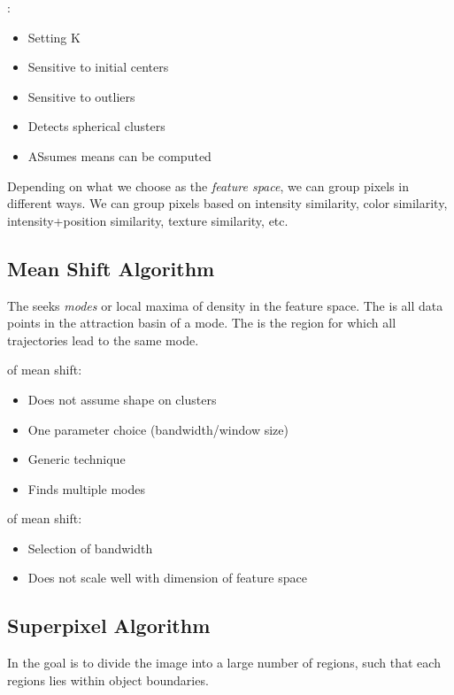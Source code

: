 \documentclass{article}
\begin{document}
:
\begin{itemize}
  \item Setting K 
  \item Sensitive to initial centers 
  \item Sensitive to outliers 
  \item Detects spherical clusters 
  \item ASsumes means can be computed 
\end{itemize}

Depending on what we choose as the \emph{feature space}, we can group pixels in different ways. We can group pixels based on intensity similarity, color similarity, intensity+position similarity, texture similarity, etc. \\ 

\subsection{Mean Shift Algorithm}

The  seeks \emph{modes} or local maxima of density in the feature space. The  is all data points in the attraction basin of a mode. The  is the region for which all trajectories lead to the same mode. 

 of mean shift: 
\begin{itemize}
  \item Does not assume shape on clusters 
  \item One parameter choice (bandwidth/window size) 
  \item Generic technique 
  \item Finds multiple modes 
\end{itemize}

 of mean shift: 
\begin{itemize}
  \item Selection of bandwidth 
  \item Does not scale well with dimension of feature space
\end{itemize}

\subsection{Superpixel Algorithm}

In  the goal is to divide the image into a large number of regions, such that each regions lies within object boundaries. 
\end{document}
